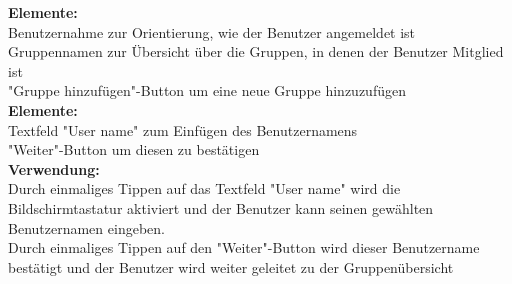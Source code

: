 \textbf{Elemente:}\\
Benutzernahme zur Orientierung, wie der Benutzer angemeldet ist\\
Gruppennamen zur Übersicht über die Gruppen, in denen der Benutzer Mitglied ist\\
"Gruppe hinzufügen"-Button um eine neue Gruppe hinzuzufügen\\
\textbf{Elemente:}\\
Textfeld "User name" zum Einfügen des Benutzernamens\\
"Weiter"-Button um diesen zu bestätigen\\
\textbf{Verwendung:}\\
Durch einmaliges Tippen auf das Textfeld "User name" wird die Bildschirmtastatur aktiviert und der Benutzer kann seinen gewählten Benutzernamen eingeben.\\
Durch einmaliges Tippen auf den "Weiter"-Button wird dieser Benutzername bestätigt und der Benutzer wird weiter geleitet zu der Gruppenübersicht\\ \\

